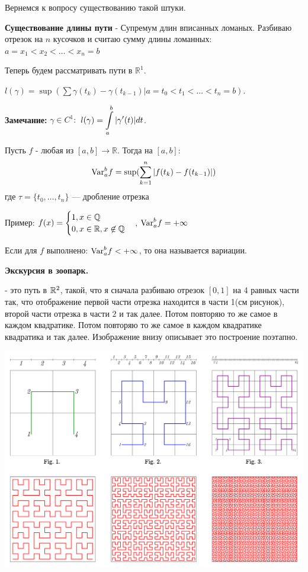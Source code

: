 Вернемся к вопросу существованию такой штуки.

\textbf{Существование длины пути} - Супремум длин вписанных ломаных. Разбиваю отрезок на $n$ кусочков и считаю сумму длины ломанных: $a=x_1<x_2<\ldots<x_n =b$

Теперь будем рассматривать пути в $\mathbb{R}^1$.

$l(\gamma) = \sup (\sum\limits\gamma(t_k)-\gamma(t_{k-1}) | a = t_0<t_1<\ldots<t_n=b)$.

\textbf{Замечание:} $\gamma \in C^1:$ $l(\gamma) = \displaystyle\int\limits_{a}^{b}|\gamma'(t)|dt$.


 Пусть $f$ - любая из $[a,b] \rightarrow \mathbb{R}$. Тогда  на $[a,b]$: 
$$\text{Var}_a^b f = \sup (\sum\limits_{k=1}^n |f(t_k)-f(t_{k-1})|)$$
где $\tau = \{t_0,\ldots, t_n\}$ --- дробление отрезка

Пример:
$f(x) = \begin{cases}
    1,x \in \mathbb{Q} \\
    0, x \in \mathbb{R}, x\not \in \mathbb{Q} 
\end{cases}$, $\text{Var}_{a}^b f = +\infty$

Если для $f$ выполнено: $\text{Var}_a^b f < + \infty$, то она называется  вариации.

\textbf{Экскурсия в зоопарк.}

 - это путь в $\mathbb{R}^2$, такой, что я сначала разбиваю отрезок $[0,1]$ на 4 равных части так, что отображение первой части отрезка находится в части 1(см рисунок), второй части отрезка в части 2 и так далее. Потом повторяю то же самое в каждом квадратике. Потом повторяю то же самое в каждом квадратике квадратика и так далее. Изображение внизу описывает это построение поэтапно.

\begin{center}
   \includegraphics[width = 15 cm]{assets/integral_hilbert_curve.svg.png}
\end{center}

